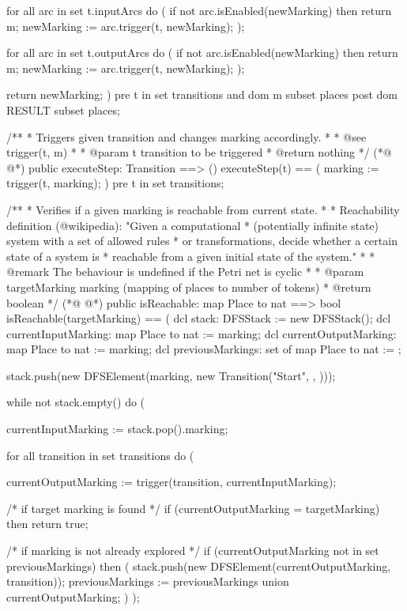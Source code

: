 \begin{vdmpp}
      for all arc in set t.inputArcs do (
        if not arc.isEnabled(newMarking) then
          return m;
        newMarking := arc.trigger(t, newMarking);
      );

      for all arc in set t.outputArcs do (
        if not arc.isEnabled(newMarking) then
          return m;
        newMarking := arc.trigger(t, newMarking);
      );

      return newMarking;
    )
    pre t in set transitions and dom m subset places
    post dom RESULT subset places;

    /**
     * Triggers given transition and changes marking accordingly.
     *
     * @see trigger(t, m)
     *
     * @param t transition to be triggered
     * @return  nothing
     */
(*@
\label{executeStep:119}
@*)
    public executeStep: Transition ==> ()
    executeStep(t) == (
      marking := trigger(t, marking);
    )
    pre t in set transitions;

    /**
     * Verifies if a given marking is reachable from current state.
     *
     * Reachability definition (@wikipedia): "Given a computational
     * (potentially infinite state) system with a set of allowed rules
     * or transformations, decide whether a certain state of a system is
     * reachable from a given initial state of the system."
     *
     * @remark The behaviour is undefined if the Petri net is cyclic
     *
     * @param targetMarking marking (mapping of places to number of tokens)
     * @return boolean
     */
(*@
\label{isReachable:138}
@*)
    public isReachable: map Place to nat ==> bool
    isReachable(targetMarking) == (
      dcl stack: DFSStack := new DFSStack();
      dcl currentInputMarking: map Place to nat := marking;
      dcl currentOutputMarking: map Place to nat := marking;
      dcl previousMarkings: set of map Place to nat := {};

      stack.push(new DFSElement(marking, new Transition("Start", { }, { })));

      while not stack.empty() do (

        currentInputMarking := stack.pop().marking;

        for all transition in set transitions do (

          currentOutputMarking := trigger(transition, currentInputMarking);

          /* if target marking is found */
          if (currentOutputMarking = targetMarking) then return true;

          /* if marking is not already explored */
          if (currentOutputMarking not in set previousMarkings) then (
            stack.push(new DFSElement(currentOutputMarking, transition));
            previousMarkings := previousMarkings union {currentOutputMarking};
          )
        );


\end{vdmpp}
